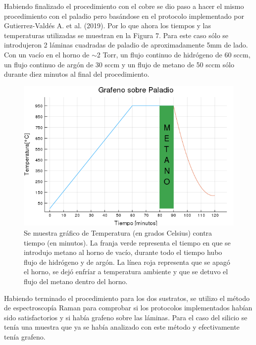 \documentclass[twocolumn,letterpaper,aps,pra,10pt]{revtex4-1}
\begin{document}
Habiendo finalizado el procedimiento con el cobre se dio paso a hacer el mismo procedimiento con el paladio pero basándose en el protocolo implementado por Gutierrez-Valdés A. et al. (2019)\cite{PaladioCVD}. Por lo que ahora los tiempos y las temperaturas utilizadas se muestran en la Figura 7. Para este caso sólo se introdujeron 2 láminas cuadradas de paladio de aproximadamente 5mm de lado. Con un vacío en el horno de $\sim$2 Torr, un flujo continuo de hidrógeno de 60 sccm, un flujo continuo de argón de 30 sccm y un flujo de metano de 50 sccm sólo durante diez minutos al final del procedimiento.

\begin{figure}[h]
\centering
\includegraphics[scale=0.3]{Grafeno_Paladio.png}
\caption{Se muestra gráfico de Temperatura (en grados Celsius) contra tiempo (en minutos). La franja verde representa el tiempo en que se introdujo metano al horno de vacío, durante todo el tiempo hubo flujo de hidrógeno y de argón. La línea roja representa que se apagó el horno, se dejó enfríar a temperatura ambiente y que se detuvo el flujo del metano dentro del horno.}
\end{figure}

Habiendo terminado el procedimiento para los dos sustratos, se utilizo el método de espectroscopía Raman para comprobar si los protocolos implementados habían sido satisfactorios y si había grafeno sobre las láminas. Para el caso del silicio se tenía una muestra que ya se había analizado con este método y efectivamente tenía grafeno.
\end{document}
